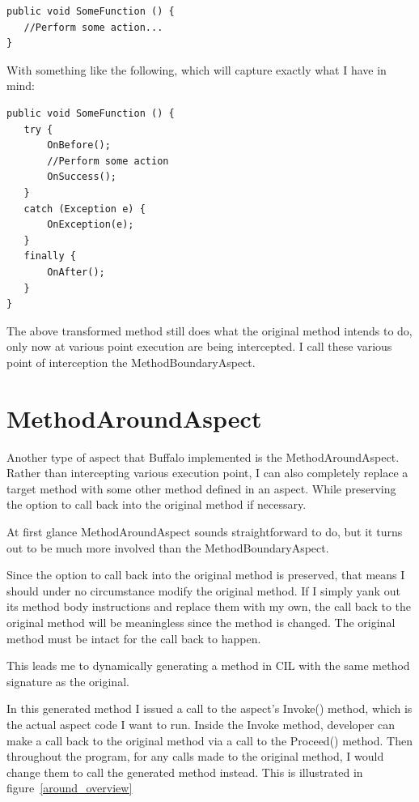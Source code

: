 \begin{lstlisting}[caption={Sample function}, label=samplefunction]
public void SomeFunction () {
   //Perform some action...
}
\end{lstlisting}

With something like the following, which will capture exactly what I have in mind:

\begin{lstlisting}[caption={Sample try-catch-finally}, label=sampletcf]
public void SomeFunction () {
   try {
       OnBefore();
       //Perform some action
       OnSuccess();
   }
   catch (Exception e) {
       OnException(e);
   }
   finally {
       OnAfter();
   }
}
\end{lstlisting}

The above transformed method still does what the original method intends to do, only now at various point execution are being intercepted. I call these various point of interception the MethodBoundaryAspect.

\section{MethodAroundAspect}
Another type of aspect that Buffalo implemented is the MethodAroundAspect. Rather than intercepting various execution point, I can also completely replace a target method with some other method defined in an aspect. While preserving the option to call back into the original method if necessary.

At first glance MethodAroundAspect sounds straightforward to do, but it turns out to be much more involved than the MethodBoundaryAspect.

Since the option to call back into the original method is preserved, that means I should under no circumstance modify the original method. If I simply yank out its method body instructions and replace them with my own, the call back to the original method will be meaningless since the method is changed. The original method must be intact for the call back to happen.

This leads me to dynamically generating a method in CIL with the same method signature as the original.

In this generated method I issued a call to the aspect’s Invoke() method, which is the actual aspect code I want to run. Inside the Invoke method, developer can make a call back to the original method via a call to the Proceed() method. Then throughout the program, for any calls made to the original method, I would change them to call the generated method instead. This is illustrated in figure~\ref{around_overview}


